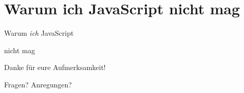 \documentclass{beamer}
\begin{document}

\section{Warum ich JavaScript nicht mag}

\begin{frame}
\Huge{
\centerline{Warum \textit{ich} JavaScript}
\centerline{nicht mag}
}
\end{frame}


\begin{frame}
\Huge{\centerline{Danke für eure Aufmerksamkeit!}}
\end{frame}

\begin{frame}
\Huge{\centerline{Fragen? Anregungen?}}
\end{frame}

\end{document}
